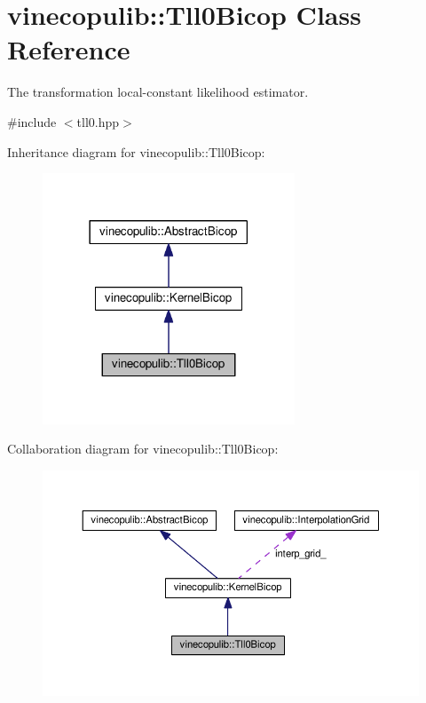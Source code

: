 \hypertarget{classvinecopulib_1_1_tll0_bicop}{}\section{vinecopulib\+:\+:Tll0\+Bicop Class Reference}
\label{classvinecopulib_1_1_tll0_bicop}


The transformation local-\/constant likelihood estimator.  




{\ttfamily \#include $<$tll0.\+hpp$>$}



Inheritance diagram for vinecopulib\+:\+:Tll0\+Bicop\+:
\nopagebreak
\begin{figure}[H]
\begin{center}
\leavevmode
\includegraphics[width=213pt]{classvinecopulib_1_1_tll0_bicop__inherit__graph}
\end{center}
\end{figure}


Collaboration diagram for vinecopulib\+:\+:Tll0\+Bicop\+:
\nopagebreak
\begin{figure}[H]
\begin{center}
\leavevmode
\includegraphics[width=350pt]{classvinecopulib_1_1_tll0_bicop__coll__graph}
\end{center}
\end{figure}
